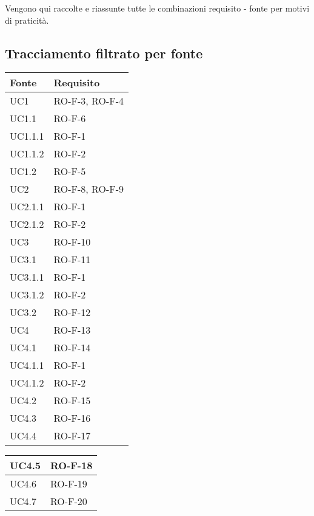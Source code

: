 Vengono qui raccolte e riassunte tutte le combinazioni requisito - fonte per motivi di praticità.
\subsection{Tracciamento filtrato per fonte}
\begin{center}
\renewcommand{\arraystretch}{1.8} %
\begin{tabular}{ |m{8em}|m{13em}| }
    \hline
    \textbf{Fonte} & \textbf{Requisito} \\
    \hline
    UC1         &   RO-F-3, RO-F-4 \\
    \hline
    UC1.1       &   RO-F-6 \\
    \hline
    UC1.1.1     &   RO-F-1 \\
    \hline
    UC1.1.2     &   RO-F-2 \\
    \hline
    UC1.2       &   RO-F-5 \\
    \hline
    UC2         &   RO-F-8, RO-F-9 \\
    \hline
    UC2.1.1     &   RO-F-1 \\
    \hline
    UC2.1.2     &   RO-F-2 \\
    \hline
    UC3         &   RO-F-10 \\
    \hline
    UC3.1       &   RO-F-11 \\
    \hline
    UC3.1.1     &   RO-F-1 \\
    \hline
    UC3.1.2     &   RO-F-2 \\
    \hline
    UC3.2       &   RO-F-12 \\
    \hline
    UC4         &   RO-F-13 \\
    \hline
    UC4.1       &   RO-F-14 \\
    \hline
    UC4.1.1     &   RO-F-1 \\
    \hline
    UC4.1.2     &   RO-F-2 \\
    \hline 
    UC4.2       &   RO-F-15 \\
    \hline
    UC4.3       &   RO-F-16 \\
    \hline
    UC4.4       &   RO-F-17 \\
    \hline
    \end{tabular}
    \newpage
    \begin{tabular}{ |m{8em}|m{13em}| }
    \hline
    UC4.5       &   RO-F-18 \\
    \hline
    UC4.6       &   RO-F-19 \\
    \hline
    UC4.7       &   RO-F-20 \\

\end{tabular}
\end{center}

